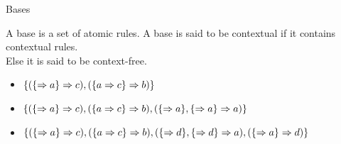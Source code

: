 \documentclass{beamer}
\begin{document}
\begin{frame}{Bases}
	\begin{definition}[Base]
		A base is a set of atomic rules.\newline
		\pause
		A base is said to be contextual if it contains contextual rules.\\
		Else it is said to be context-free.
	\end{definition}
	\pause
	\begin{itemize}
		\item $\{(\{\Rightarrow a\}\Rightarrow c), (\{ a\Rightarrow c\}\Rightarrow b)\}$
		\item $\{(\{ \Rightarrow a\}\Rightarrow c), (\{ a\Rightarrow c\}\Rightarrow b),(\{\Rightarrow a\},\{\Rightarrow a\}\Rightarrow a)\}$
		\item $\{(\{ \Rightarrow a\}\Rightarrow c), (\{ a\Rightarrow c\}\Rightarrow b),(\{\Rightarrow d\},\{\Rightarrow d\}\Rightarrow a),(\{\Rightarrow a\}\Rightarrow d)\}$
	\end{itemize}
\end{frame}
\end{document}
